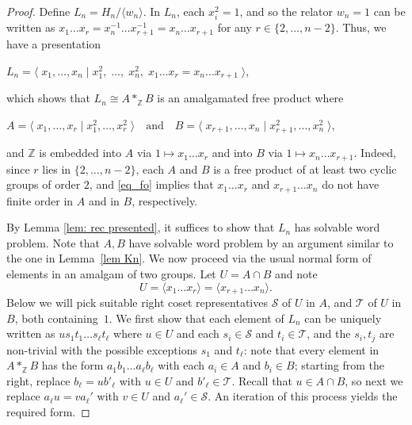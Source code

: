 \documentclass[11pt]{amsart}
\theoremstyle{mythm}
\theoremstyle{mydef}
\theoremstyle{myrem}
\numberwithin{equation}{section}
\newcommand{\la}{\langle}
\newcommand{\ra}{\rangle}
\newcommand{\ZZ}{{\mathbb{Z}}}
\newcommand{\bc}{\begin{center}}
\newcommand{\ec}{\end{center}}
\begin{document}
  \begin{proof} Define $L_n = H_n/\la w_n \ra$. In $L_n$, each $x_i^2=1$, and so the relator $w_n=1$ can be written as  $x_1 \ldots x_r =  x_{n}^{-1} \ldots   x_{r+1}^{-1}=  x_{n} \ldots   x_{r+1}$ for any $r\in\{2,\ldots,n-2\}$. Thus, we have a presentation
  \bc $L_n = \la\; x_1,  \dots , x_n \mid x_1^2,\;\ldots,\;x_n^2,\; x_1 \ldots x_r =  x_{n} \ldots   x_{r+1} \;\ra$,  \ec
which shows that $L_n\cong A*_\ZZ B$ is an amalgamated free product where 
 \bc $A= \la\; x_1, \ldots, x_r \mid x_1^2,\ldots,x_r^2 \;\ra \quad\text{and}\quad B= \la\; x_{r+1}, \ldots, x_n \mid x_{r+1}^2,\ldots,x_n^2\; \ra$, \ec
 and $\ZZ$ is embedded into $A $ via $1 \mapsto x_1 \ldots x_r$ and into $B$ via $1 \mapsto   x_{n} \ldots x_{r+1} $. Indeed, since $r$ lies in $\{2,\ldots, n-2\}$, each $A$ and $B$ is a free product of at least two cyclic groups of order $2$, and \eqref{eq_fo} implies that $x_1\ldots x_r$ and $x_{r+1}\ldots x_n$ do not have finite order in $A$ and in $B$, respectively. 
 
 By Lemma \ref{lem: rec presented}, it suffices to show that $L_n$ has solvable word problem. Note that $A,B$ have solvable word problem by an argument similar to the one in Lemma~\ref{lem Kn}. We  now   proceed via the  usual normal form of elements in an amalgam of two groups.  
 Let $U = A\cap B$ and note  \[U=\langle x_1\ldots x_r\rangle = \langle x_{r+1}\ldots x_n\rangle.\] Below we will pick suitable right coset representatives $\mathcal{S}$ of $U$ in $A$,  and $\mathcal{T}$ of $U$ in $B$, both containing~$1$. We first show that each element of $L_n$ can be uniquely written as $u s_1t_1 \ldots s_\ell t_\ell$ where $u\in U$ and each $s_i\in \mathcal{S}$ and $t_i\in \mathcal{T}$, and the $s_i, t_j$ are non-trivial with the possible exceptions $s_1$ and $t_\ell$:
  note that every element in $ A*_\ZZ B$ has the form $a_1b_1\ldots a_\ell b_\ell$ with each $a_i\in A$ and $b_i\in B$; starting from the right, replace $b_\ell = ub'_\ell$ with $u\in U$ and $b'_\ell\in \mathcal{T}$. Recall that $u\in A\cap B$, so next we replace $a_\ell u = va_\ell'$ with $v\in U$ and $a_\ell'\in \mathcal{S}$. An iteration of this process yields the required form. 


\end{proof}
\end{document}
